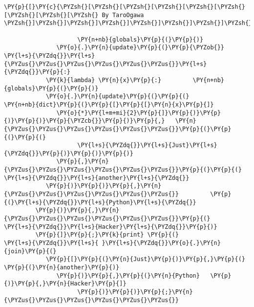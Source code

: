 \begin{Verbatim}[commandchars=\\\{\},codes={\catcode`\$=3\catcode`\^=7\catcode`\_=8}]
\PY{p}{[}\PY{c}{\PYZsh{}[\PYZsh{}[\PYZsh{}[\PYZsh{}[\PYZsh{}[\PYZsh{}[\PYZsh{}[\PYZsh{}[\PYZsh{} By TaroOgawa \PYZsh{}]\PYZsh{}]\PYZsh{}]\PYZsh{}]\PYZsh{}]\PYZsh{}]\PYZsh{}]\PYZsh{}]\PYZsh{}]}

                     \PY{n+nb}{globals}\PY{p}{(}\PY{p}{)}
               \PY{o}{.}\PY{n}{update}\PY{p}{(}\PY{p}{\PYZob{}}   \PY{l+s}{\PYZdq{}}\PY{l+s}{\PYZus{}\PYZus{}\PYZus{}\PYZus{}\PYZus{}\PYZus{}}\PY{l+s}{\PYZdq{}}\PY{p}{:}
            \PY{k}{lambda} \PY{n}{x}\PY{p}{:}         \PY{n+nb}{globals}\PY{p}{(}\PY{p}{)}
            \PY{o}{.}\PY{n}{update}\PY{p}{(}\PY{p}{(}         \PY{n+nb}{dict}\PY{p}{(}\PY{p}{[}\PY{p}{[}\PY{n}{x}\PY{p}{]}
               \PY{o}{*}\PY{l+m+mi}{2}\PY{p}{]}\PY{p}{)}\PY{p}{)}\PY{p}{)}\PY{p}{\PYZcb{}}\PY{p}{)}\PY{p}{,}   \PY{n}{\PYZus{}\PYZus{}\PYZus{}\PYZus{}\PYZus{}\PYZus{}}\PY{p}{(}\PY{p}{(}\PY{p}{(}
                     \PY{l+s}{\PYZdq{}}\PY{l+s}{Just}\PY{l+s}{\PYZdq{}}\PY{p}{)}\PY{p}{)}\PY{p}{)}
               \PY{p}{,}\PY{n}{\PYZus{}\PYZus{}\PYZus{}\PYZus{}\PYZus{}\PYZus{}}\PY{p}{(}\PY{p}{(}   \PY{l+s}{\PYZdq{}}\PY{l+s}{another}\PY{l+s}{\PYZdq{}}
            \PY{p}{)}\PY{p}{)}\PY{p}{,}\PY{n}{\PYZus{}\PYZus{}\PYZus{}\PYZus{}\PYZus{}\PYZus{}}         \PY{p}{(}\PY{l+s}{\PYZdq{}}\PY{l+s}{Python}\PY{l+s}{\PYZdq{}}
         \PY{p}{)}\PY{p}{,}\PY{n}{\PYZus{}\PYZus{}\PYZus{}\PYZus{}\PYZus{}\PYZus{}}\PY{p}{(}               \PY{l+s}{\PYZdq{}}\PY{l+s}{Hacker}\PY{l+s}{\PYZdq{}}\PY{p}{)}
         \PY{p}{]}\PY{p}{;}\PY{k}{print} \PY{p}{(}               \PY{l+s}{\PYZdq{}}\PY{l+s}{ }\PY{l+s}{\PYZdq{}}\PY{o}{.}\PY{n}{join}\PY{p}{(}
            \PY{p}{[}\PY{p}{(}\PY{n}{Just}\PY{p}{)}\PY{p}{,}\PY{p}{(}         \PY{p}{(}\PY{n}{another}\PY{p}{)}
               \PY{p}{)}\PY{p}{,}\PY{p}{(}\PY{n}{Python}   \PY{p}{)}\PY{p}{,}\PY{n}{Hacker}\PY{p}{]}
                     \PY{p}{)}\PY{p}{)}\PY{p}{;}\PY{n}{\PYZus{}\PYZus{}\PYZus{}\PYZus{}\PYZus{}\PYZus{}}
\end{Verbatim}
